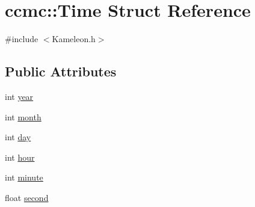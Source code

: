 \hypertarget{structccmc_1_1_time}{
\section{ccmc::Time Struct Reference}
\label{structccmc_1_1_time}
}


{\ttfamily \#include $<$Kameleon.h$>$}

\subsection*{Public Attributes}
\begin{DoxyCompactItemize}
\item 
int \hyperlink{structccmc_1_1_time_a5f1d2d7bf202a400b3a101645f93c1a0}{year}
\item 
int \hyperlink{structccmc_1_1_time_a837bd8b4d92b602f60f99741270515d2}{month}
\item 
int \hyperlink{structccmc_1_1_time_aadc5355945380825c132e4c1cddcb24f}{day}
\item 
int \hyperlink{structccmc_1_1_time_aacdc28bb90a2c42e0b266a596220ef40}{hour}
\item 
int \hyperlink{structccmc_1_1_time_a163cc0bbdcf86f8a009a26d3c2764f17}{minute}
\item 
float \hyperlink{structccmc_1_1_time_a569557baed8e5bf1e30cea22aa4a76c9}{second}
\end{DoxyCompactItemize}


